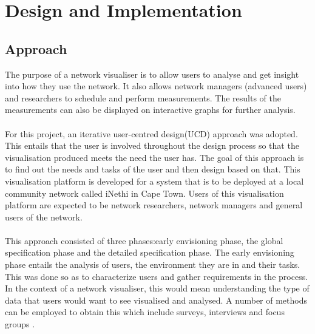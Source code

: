 \section{Design and Implementation}
\subsection{Approach}
The purpose of a network visualiser is to allow users to analyse and get insight into how they use the network\cite{Ruan2018}. It also allows network managers (advanced users) and researchers to schedule and perform measurements. The results of the measurements can also be displayed on interactive graphs for further analysis.
\paragraph{}
For this project, an iterative user-centred design(UCD) approach was adopted. This entails that the user is involved throughout the design process so that the visualisation produced meets the need the user has\cite{Andrews:2006:EIV:1168149.1168151}. The goal of this approach is to find out the needs and tasks of the user and then design based on that\cite{Dylggduu}. This visualisation platform is developed for a system that is to be deployed at a local community network called iNethi in Cape Town. Users of this visualisation platform are expected to be network researchers, network managers and general users of the network.
\paragraph{}
This approach consisted of three phases:early envisioning phase, the global specification phase and the detailed specification phase\cite{Kulykinbook}. The early envisioning phase entails the analysis of users, the environment they are in and their tasks. This was done so as to characterize users and gather requirements in the process\cite{Kulykinbook}. In the context of a network visualiser, this would mean understanding the type of data that users would want to see visualised and analysed. A number of methods can be employed to obtain this which include surveys, interviews and focus groups\cite{Kulykinbook} \cite{Abras04user-centereddesign}.
